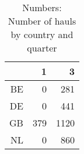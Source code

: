 \begin{table}[ht]
\centering
\begin{tabular}{rrr}
  \hline
 & 1 & 3 \\ 
  \hline
BE & 0 & 281 \\ 
  DE & 0 & 441 \\ 
  GB & 379 & 1120 \\ 
  NL & 0 & 860 \\ 
   \hline
\end{tabular}
\caption{Numbers: Number of hauls by country and quarter} 
\end{table}
